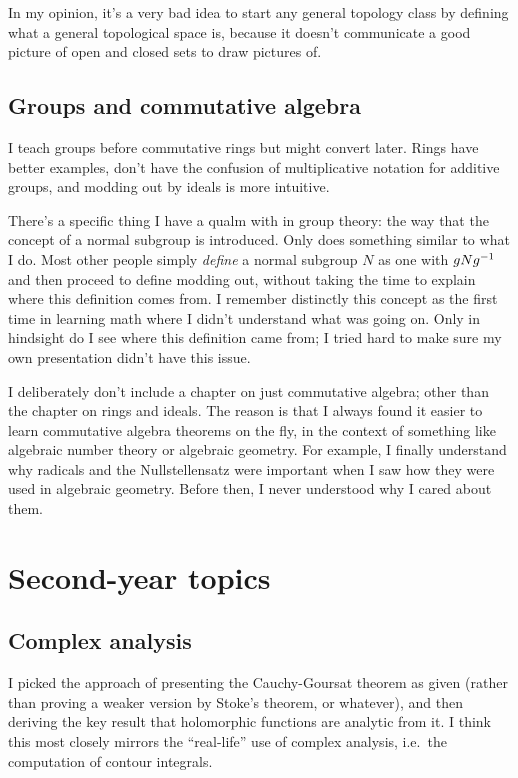 In my opinion, it's a very bad idea to start any general topology class
by defining what a general topological space is,
because it doesn't communicate a good picture of open and closed sets
to draw pictures of.

\subsection*{Groups and commutative algebra}
I teach groups before commutative rings but might convert later.
Rings have better examples, don't have the confusion of multiplicative
notation for additive groups, and modding out by ideals is more intuitive.

There's a specific thing I have a qualm with in group theory:
the way that the concept of a normal subgroup is introduced.
Only \cite{ref:gowers} does something similar to what I do.
Most other people simply \emph{define} a normal subgroup $N$
as one with $gNg^{-1}$ and then proceed to define modding out,
without taking the time to explain where this definition comes from.
I remember distinctly this concept as the first time in learning math
where I didn't understand what was going on.
Only in hindsight do I see where this definition came from;
I tried hard to make sure my own presentation didn't have this issue.

I deliberately don't include a chapter on just commutative algebra;
other than the chapter on rings and ideals.
The reason is that I always found it easier to learn
commutative algebra theorems on the fly,
in the context of something like algebraic number theory or algebraic geometry.
For example, I finally understand why radicals and the Nullstellensatz were important
when I saw how they were used in algebraic geometry.
Before then, I never understood why I cared about them.


\section{Second-year topics}
\subsection*{Complex analysis}
I picked the approach of presenting the Cauchy-Goursat theorem as given
(rather than proving a weaker version by Stoke's theorem, or whatever),
and then deriving the key result that holomorphic functions are analytic
from it.
I think this most closely mirrors the ``real-life'' use of complex
analysis, i.e.\ the computation of contour integrals.

